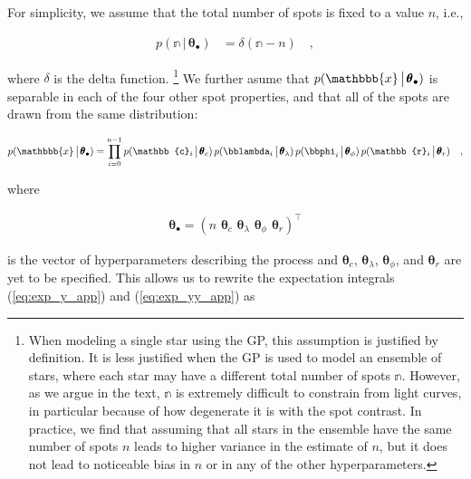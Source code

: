\documentclass[modern,linenumbers]{aastex62}
\begin{document}
For simplicity, we assume that
the total number of spots is fixed to a value $n$, i.e.,
%
\begin{linenomath}\begin{align}
        p(\mathbb{n} \, \big| \, \pmb{\theta}_\bullet)
         & =
        \delta(\mathbb{n} - n)
        \quad,
    \end{align}\end{linenomath}
%
where $\delta$ is the delta function.%
\footnote{%
    When modeling a single star using the GP, this assumption is justified by
    definition. It is less justified when the GP is used to model an ensemble of
    stars, where each star may have a different total number of spots $\mathbb{n}$.
    However, as we argue in the text, $\mathbb{n}$ is extremely difficult to constrain
    from light curves, in particular because of how degenerate it is with
    the spot contrast. In practice, we find that assuming that all stars in the
    ensemble have the same number of spots $n$ leads to higher variance in the
    estimate of $n$, but it does not lead to noticeable bias in $n$ or in any of
    the other hyperparameters.
}
We further asume that
$p(\mathbbb{x} \, \big| \, \pmb{\theta}_\bullet)$
is separable in each of the four other spot properties, and that all of the spots
are drawn from the same distribution:
%
\begin{linenomath}\begin{align}
        p(\mathbbb{x} \, \big| \, \pmb{\theta}_\bullet)
        =
        \prod_{i=0}^{n-1}
        p(\mathbb{c}_i \, \big| \, \pmb{\theta}_{c}) \,
        p(\bblambda_i \, \big| \, \pmb{\theta}_{\lambda}) \,
        p(\bbphi_i \, \big| \, \pmb{\theta}_{\phi})\,
        p(\mathbb{r}_i \, \big| \, \pmb{\theta}_{r})
        \quad,
    \end{align}\end{linenomath}
%
where
%
\begin{linenomath}\begin{align}
        \pmb{\theta}_\bullet = \left(
        n \, \,
        \pmb{\theta}_{c} \, \,
        \pmb{\theta}_{\lambda} \, \,
        \pmb{\theta}_{\phi} \, \,
        \pmb{\theta}_{r} \right)^\top
    \end{align}\end{linenomath}
%
is the vector of hyperparameters describing the process and
$\pmb{\theta}_{c}$,
$\pmb{\theta}_{\lambda}$,
$\pmb{\theta}_{\phi}$, and
$\pmb{\theta}_{r}$ are yet to be specified.
%
This allows us to rewrite the expectation integrals (\ref{eq:exp_y_app})
and (\ref{eq:exp_yy_app}) as
\end{document}
